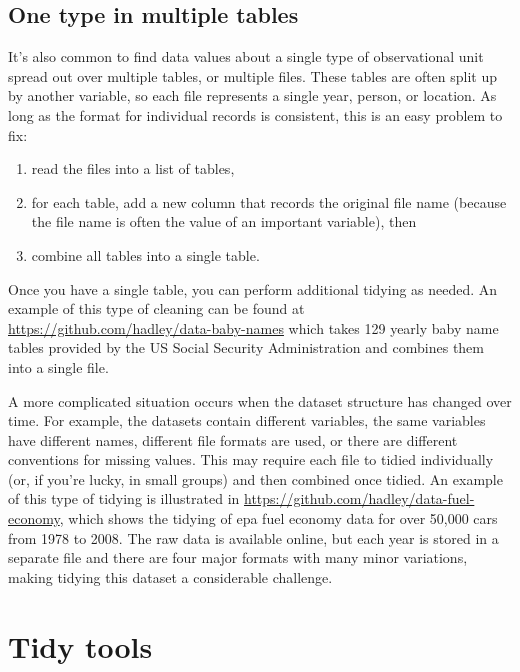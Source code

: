 \documentclass[article]{jss}
\begin{document}

\subsection{One type in multiple tables}

It's also common to find data values about a single type of observational unit spread out over multiple tables, or multiple files. These tables are often split up by another variable, so each file represents a single year, person, or location. As long as the format for individual records is consistent, this is an easy problem to fix: 

\begin{enumerate}
  \item read the files into a list of tables,

\item for each table, add a new column that records the original file name (because the file name is often the value of an important variable), then

  \item combine all tables into a single table. 
\end{enumerate}

Once you have a single table, you can perform additional tidying as needed. An example of this type of cleaning can be found at \url{https://github.com/hadley/data-baby-names} which takes 129 yearly baby name tables provided by the US Social Security Administration and combines them into a single file.

A more complicated situation occurs when the dataset structure has changed over time. For example, the datasets contain different variables, the same variables have different names, different file formats are used, or there are different conventions for missing values. This may require each file to tidied individually (or, if you're lucky, in small groups) and then combined once tidied. An example of this type of tidying is illustrated in \url{https://github.com/hadley/data-fuel-economy}, which shows the tidying of {\sc epa} fuel economy data for over 50,000 cars from 1978 to 2008. The raw data is available online, but each year is stored in a separate file and there are four major formats with many minor variations, making tidying this dataset a considerable challenge.

\section{Tidy tools}
\label{sec:tidy-tools}
\end{document}
